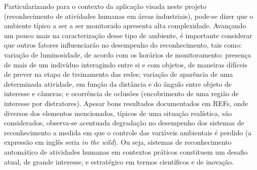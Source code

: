 Particularizando para o contexto da aplicação visada neste projeto (reconhecimento de atividades humanas em áreas industriais), pode-se dizer que o ambiente típico a ser a ser monitorado apresenta alta complexidade. Avançando um pouco mais na caracterização desse tipo de ambiente, é importante considerar que outros fatores influenciarão no desempenho do reconhecimento, tais como: variação de luminosidade, de acordo com os horários de monitoramento; presença de mais de um indivíduo interagindo entre si e com objetos, de maneiras difíceis de prever na etapa de treinamento das redes; variação de aparência de uma determinada atividade, em função da distância e do ângulo entre objeto de interesse e câmeras; e ocorrência de oclusões (encobrimento de uma região de interesse por distratores).
%
Apesar bons resultados documentados em REFs, onde diversos dos elementos mencionados, típicos de uma situação realística, são considerados, observa-se acentuada degradação no desempenho dos sistemas de reconhecimento a medida em que o controle das variáveis ambientais é perdido (a expressão em inglês seria \emph{in the wild}). Ou seja, sistemas de reconhecimento automático de atividades humanas em contextos práticos constituem um desafio atual, de grande interesse, e estratégico em termos científicos e de inovação.

